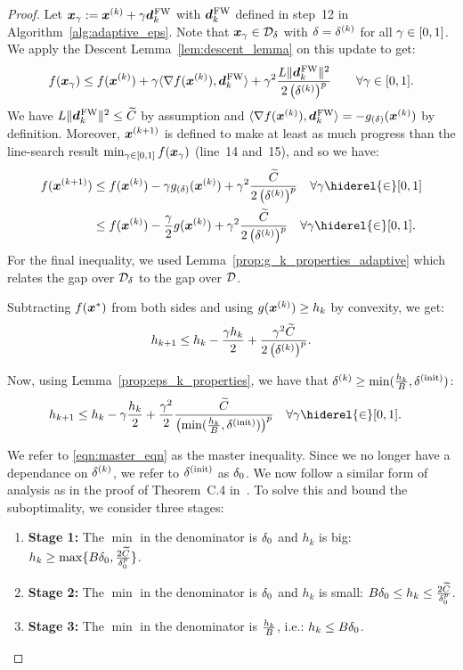 \begin{proof}
	Let $\bm{x}_\gamma := \bm{x}^{(k)} + \gamma \bm{d}_k^{\hspace{0.05em}\textnormal{FW}}$ with $\bm{d}_k^{\hspace{0.05em}\textnormal{FW}}$ defined in step~12 in Algorithm~\ref{alg:adaptive_eps}. Note that $\bm{x}_\gamma \in \mathcal{D}_{\delta}$ with $\delta = \delta^{(k)}$ for all $\gamma \in [0,1]$. We apply the Descent Lemma~\ref{lem:descent_lemma} on this update to get:
	$$f(\bm{x}_\gamma) \leq f(\bm{x}^{(k)}) + \gamma\langle\nabla f(\bm{x}^{(k)}),\bm{d}_k^{\hspace{0.05em}\textnormal{FW}}\rangle + \gamma^2\frac{L \|\bm{d}_k^{\hspace{0.05em}\textnormal{FW}}\|^2}{2\left(\delta^{(k)}\right)^p} \qquad \forall \gamma \in [0,1].$$
	We have $L \| \bm{d}_k^{\hspace{0.05em}\textnormal{FW}} \|^2 \leq \widetilde{C}$ by assumption and $\langle\nabla f(\bm{x}^{(k)}),\bm{d}_k^{\hspace{0.05em}\textnormal{FW}}\rangle = -g_{(\delta)}(\bm{x}^{(k)})$ by definition. Moreover, $\bm{x}^{(k+1)}$ is defined to make at least as much progress than the line-search result
	$\min_{\gamma \in [0,1]} f(\bm{x}_\gamma)$ (line~14 and~15), and so we have:
	\begin{align*}
		f(\xnext) &\leq f(\xk) - \stepsize\geps + \stepsize^2\frac{\Cconst}{2 \left(\epsk{k}\right)^p} \quad \forall \stepsize \hiderel{\in} [0,1] \\
		&\leq f(\xk) - \frac{\stepsize}{2}\gk + \stepsize^2\frac{\Cconst}{2 \left(\epsk{k}\right)^p} \quad \forall \stepsize \hiderel{\in} [0,1].
	\end{align*}
	For the final inequality, we used Lemma~\ref{prop:g_k_properties_adaptive} which relates the gap over $\mathcal{D}_{\delta}$ to the gap over $\mathcal{D}$.

	Subtracting $f(\bm{x}^{*})$ from both sides and using $g(\bm{x}^{(k)})\geq h_k$ by convexity, we get:
	$$h_{k+1}\leq h_k-\frac{\gamma h_k}{2} + \frac{\gamma^2\widetilde{C}}{2 \left(\delta^{(k)}\right)^p}.$$

	Now, using Lemma~\ref{prop:eps_k_properties}, we have that $\delta^{(k)}\geq\min(\frac{h_k}{B},\delta^{(\mathrm{init})})$:
	\begin{align}
		\label{eqn:master_eqn}
		\hnext &\leq\hk-\stepsize\frac{\hk}{2} + \frac{\stepsize^2}{2}\frac{\Cconst}{\left(\min(\frac{\hk}{\gunifBound},\epsk{\mathrm{init}})\right)^p} \quad \forall \stepsize \hiderel{\in} [0,1].
	\end{align}

	We refer to \eqref{eqn:master_eqn} as the master inequality. Since we no longer have a dependance on $\delta^{(k)}$, we refer to $\delta^{(\mathrm{init})}$ as $\delta_0$. 
	We now follow a similar form of analysis as in the proof of Theorem~C.4 in~\citet{lacoste2012block}.
	To solve this and bound the suboptimality, we consider three stages:
	\begin{enumerate}
		\item \textbf{Stage 1:} The $\min$ in the denominator is $\delta_0$ and $h_k$ is big: $h_k\geq \max\{ B\delta_0, \frac{2\widetilde{C}}{\delta_0^p}\}$.
		\item \textbf{Stage 2:} The $\min$ in the denominator is $\delta_0$ and $h_k$ is small: $B\delta_0\leq h_k\leq\frac{2\widetilde{C}}{\delta_0^p}$.
		\item \textbf{Stage 3:} The $\min$ in the denominator is $\frac{h_k}{B}$, i.e.: $h_k\leq B\delta_0$.
	\end{enumerate}


\end{proof}
